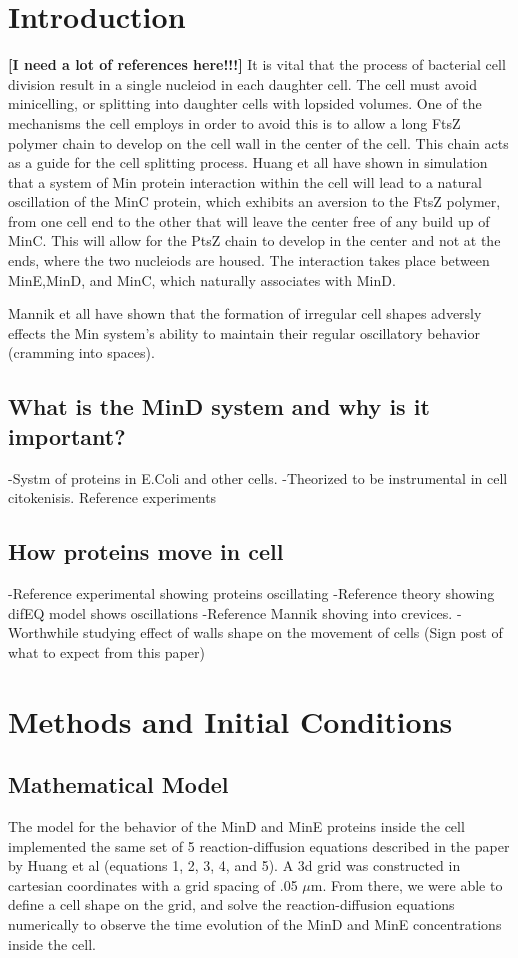 \documentclass[letterpaper,twocolumn,amsmath,amssymb,pre]{revtex4-1}
\newcommand{\red}[1]{{\bf \color{red} #1}}
\newcommand{\fixme}[1]{\red{[#1]}}
\begin{document}
\section{Introduction}
\fixme{I need a lot of references here!!!}
It is vital that the process of bacterial cell division result in a single
nucleiod in each daughter cell.  The cell must avoid minicelling, or
splitting into daughter cells with lopsided volumes.  One of the mechanisms
the cell employs in order to avoid this is to allow a long FtsZ polymer
chain to develop on the cell wall in the center of the cell.  This chain
acts as a guide for the cell splitting process.  Huang et all have shown in
simulation that a system of Min protein interaction within the cell will
lead to a natural oscillation of the MinC protein, which exhibits an
aversion to the FtsZ polymer, from one cell end to the other that will
leave the center free of any build up of MinC.  This will allow for the
PtsZ chain to develop in the center and not at the ends, where the two
nucleiods are housed.  The interaction takes place between MinE,MinD, and
MinC, which naturally associates with MinD.

Mannik et all have shown that the formation of irregular cell shapes
adversly effects the Min system's ability to maintain their regular
oscillatory behavior (cramming into spaces).

\subsection{What is the MinD system and why is it important?}


-Systm of proteins in E.Coli and other cells.
-Theorized to be instrumental in cell citokenisis. Reference experiments
\subsection{How proteins move in cell}
-Reference experimental showing proteins oscillating
-Reference theory showing difEQ model shows oscillations
-Reference Mannik shoving into crevices.
-Worthwhile studying effect of walls shape on the movement of cells
(Sign post of what to expect from this paper)

\section{Methods and Initial Conditions}
\subsection{Mathematical Model} %
The model for the behavior of the MinD and MinE proteins inside the cell
implemented the same set of 5 reaction-diffusion equations described in the paper
by Huang et al (equations 1, 2, 3, 4, and 5). A 3d grid was constructed in
cartesian coordinates with a grid spacing of .05 $\mu$m. From there, we
were able to define a cell shape on the grid, and solve the
reaction-diffusion equations numerically to observe the time evolution of
the MinD and MinE concentrations inside the cell.
\end{document}

